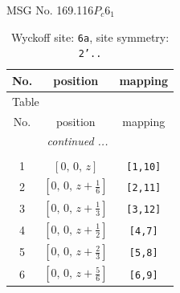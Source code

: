 \documentclass[fleqn,8pt]{jsarticle}
\begin{document}
\setcounter{MaxMatrixCols}{32}

\renewcommand{\tablename}{Table~}
\renewcommand{\figurename}{Figure~}
\begin{center}
\LARGE
MSG No. 169.116\quad$P_{c}6_{1}$
\end{center}
\renewcommand{\arraystretch}{1.2}
\begin{longtable}{ccc}
\caption{Wyckoff site: {\tt 6a}, site symmetry: {\tt 2'..}}
 \\
 \hline \hline
No. & position & mapping \\ \hline \endfirsthead

\multicolumn{2}{l}{\tablename\ \thetable{}} \\
 \hline \hline
No. & position & mapping \\ \hline \endhead

 \hline \hline
\multicolumn{2}{r}{\footnotesize\it continued ...} \\ \endfoot

 \hline \hline
\multicolumn{2}{r}{} \\ \endlastfoot

1 & $\left[ 0,\, 0,\, z \right]$ & {\tt [1,10]} \\ \hline
2 & $\left[ 0,\, 0,\, z + \frac{1}{6} \right]$ & {\tt [2,11]} \\ \hline
3 & $\left[ 0,\, 0,\, z + \frac{1}{3} \right]$ & {\tt [3,12]} \\ \hline
4 & $\left[ 0,\, 0,\, z + \frac{1}{2} \right]$ & {\tt [4,7]} \\ \hline
5 & $\left[ 0,\, 0,\, z + \frac{2}{3} \right]$ & {\tt [5,8]} \\ \hline
6 & $\left[ 0,\, 0,\, z + \frac{5}{6} \right]$ & {\tt [6,9]} \\
\end{longtable}
\renewcommand{\arraystretch}{1.2}
\end{document}
